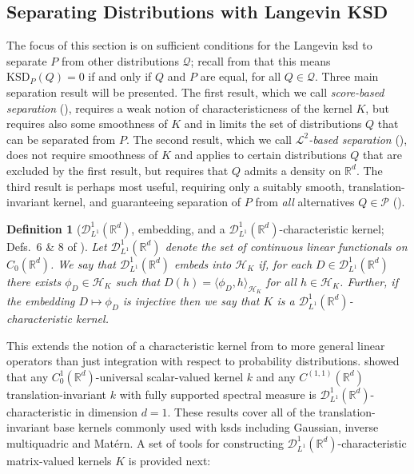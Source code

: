 \documentclass[12pt,paper=letter]{scrreprt}
\newtheorem{definition}{Definition}[chapter]
\newcommand{\sss}[1]{\scriptscriptstyle{#1}}
\def\R{\mathbb{R}}
\newcommand{\Dset}{\mathscr{D}}
\newcommand{\DL}[1]{\Dset^{#1}_{\sss{L^1}}}
\begin{document}
\subsection{Separating Distributions with Langevin KSD}
\label{subsec: sep for lang ksd}

The focus of this section is on sufficient conditions for the Langevin \ac{ksd} to separate $P$ from other distributions $\mathcal{Q}$; recall from  that this means $\mathrm{KSD}_P(Q) = 0$ if and only if $Q$ and $P$ are equal, for all $Q \in \mathcal{Q}$.
Three main separation result will be presented.
The first result, which we call \emph{score-based separation} (), requires a weak notion of characteristicness of the kernel $K$, but requires also some smoothness of $K$ and in limits the set of distributions $Q$ that can be separated from $P$.
The second result, which we call \emph{$\mathcal{L}^2$-based separation} (), does not require smoothness of $K$ and applies to certain distributions $Q$ that are excluded by the first result, but requires that $Q$ admits a density on $\mathbb{R}^d$.
The third result is perhaps most useful, requiring only a suitably smooth, translation-invariant kernel, and guaranteeing separation of $P$ from \emph{all} alternatives $Q \in \mathcal{P}$ ().




\begin{definition}[$\DL{1}(\R^d)$, embedding, and a $\DL{1}(\R^d)$-characteristic kernel; Defs.~6 \& 8 of \citealp{barp2022targeted}]
    Let $\DL{1}(\R^d)$ denote the set of continuous linear functionals on $C_0(\R^d)$.
    We say that $\DL{1}(\R^d)$ \emph{embeds into} $\mathcal{H}_K$ if, for each $D \in \DL{1}(\R^d)$ there exists $\phi_D \in \mathcal{H}_K$ such that $D(h) = \langle \phi_D , h \rangle_{\mathcal{H}_K}$ for all $h \in \mathcal{H}_K$.
    Further, if the embedding $D \mapsto \phi_D$ is injective then we say that $K$ is a $\DL{1}(\R^d)$-characteristic kernel.
\end{definition}

\noindent This extends the notion of a characteristic kernel from  to more general linear operators than just integration with respect to probability distributions.
\citet[][Thm. 12, Tab. 1, and Cor. 38]{simon2018kernel} showed that any $C_0^1(\mathbb{R}^d)$-universal scalar-valued kernel $k$ and any $C^{(1,1)}(\mathbb{R}^d)$ translation-invariant $k$ with fully supported spectral
measure is $\DL{1}(\R^d)$-characteristic in dimension $d = 1$. 
These results cover all of the translation-invariant
base kernels commonly used with \acp{ksd} including Gaussian, inverse multiquadric and Mat\'{e}rn.
A set of tools for constructing $\DL{1}(\R^d)$-characteristic matrix-valued kernels $K$ is provided next:
\end{document}
